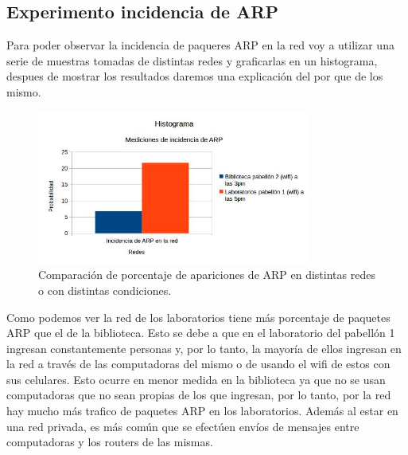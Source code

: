 \subsection{Experimento incidencia de ARP}

Para poder observar la incidencia de paqueres ARP en la red voy a utilizar una serie de muestras tomadas de distintas redes y graficarlas en un histograma, despues de mostrar
los resultados daremos una explicación del por que de los mismo.

\begin{figure}[ht!]
\centering
\includegraphics[width=90mm]{imagenes/IncidenciaARP.jpg}
\caption{Comparación de porcentaje de apariciones de ARP en distintas redes o con distintas condiciones.\label{overflow}}
\end{figure}

Como podemos ver la red de los laboratorios tiene más porcentaje de paquetes ARP que el de la biblioteca. Esto se debe a que en el laboratorio del pabellón 1 ingresan 
constantemente personas y, por lo tanto, la mayoría de ellos ingresan en la red a través de las computadoras del mismo o de usando el wifi de estos con sus celulares. Esto 
ocurre en menor medida en la biblioteca ya que no se usan computadoras que no sean propias de los que ingresan, por lo tanto, por la red hay mucho más trafico de paquetes 
ARP en los laboratorios. Además al estar en una red privada, es más común que se efectúen envíos de mensajes entre computadoras y los routers de las mismas.

